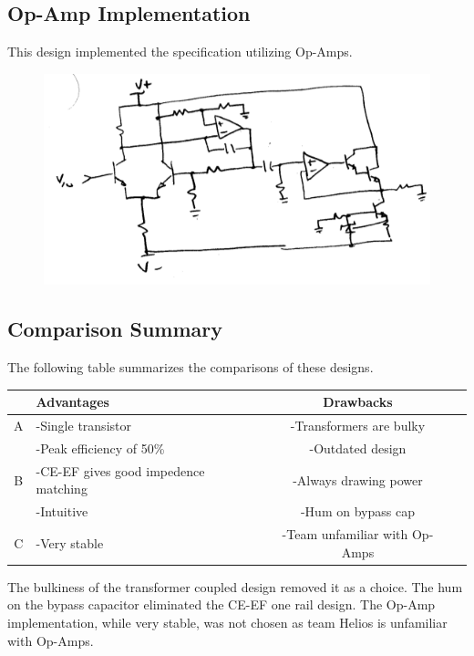 \documentclass[journal]{IEEEtran}
\begin{document}
\subsection{Op-Amp Implementation}

This design implemented the specification utilizing Op-Amps.

\begin{figure}[H]
\centering
\includegraphics[scale=.4]{reject-3.png}
\label{fig_reject_3}
\end{figure}

\subsection{Comparison Summary}

The following table summarizes the comparisons of these designs. 

\begin{tabular}{|c|p{3cm}|c|c|}
\hline
& Advantages & Drawbacks \\
\hline
A & -Single transistor & -Transformers are bulky\\
  & -Peak efficiency of 50\% & -Outdated design\\
\hline
B& -CE-EF gives good impedence matching & -Always drawing power \\
 & -Intuitive & -Hum on bypass cap\\
\hline
C & -Very stable & -Team unfamiliar with Op-Amps\\
\hline
\end{tabular}

The bulkiness of the transformer coupled design removed it as a choice. The hum on the bypass capacitor eliminated the CE-EF one rail design. The Op-Amp implementation, while very stable, was not chosen as team Helios is unfamiliar with Op-Amps.
\end{document}
